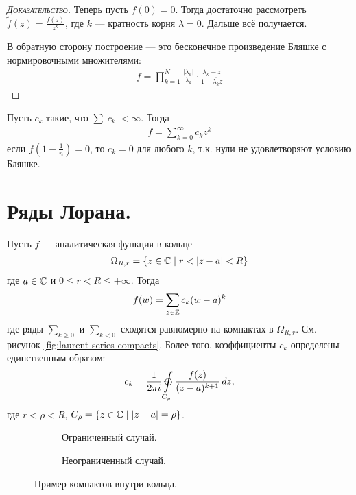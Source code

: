 \documentclass[../complex-analysis.tex]{subfiles}
\begin{document}
\begin{proof}[\normalfont\textsc{Доказательство}]
 Теперь пусть $ f(0) = 0 $. Тогда достаточно рассмотреть  $ \tilde f(z) = \frac{f(z)}{z^{k}} $, где $ k $ --- кратность корня $ \lambda = 0 $. Дальше всё получается.

 В обратную сторону построение --- это бесконечное произведение Бляшке с нормировочными множителями:
  \begin{align*}
   f = \prod_{k=1}^{N} \frac{\left| \lambda_k \right|}{\lambda_k} \cdot \frac{\lambda_k -z}{1 - \overline{\lambda_k} z}
 \end{align*}
\end{proof}

\begin{exmpl*}
 Пусть $ c_k $ такие, что $ \sum \left| c_k \right| < \infty $. Тогда
 \begin{align*}
  f = \sum_{k=0}^{\infty} c_k z^{k}
 \end{align*} если $ f\left(1 - \frac{1}{n}\right) = 0 $, то $ c_k = 0 $ для любого $ k $, т.к. нули не удовлетворяют условию Бляшке.
\end{exmpl*}

\newpage
\section{Ряды Лорана.}

\begin{thm}
 Пусть $ f $ --- аналитическая функция в кольце
 \begin{align*}
  \Omega_{R,r} = \left\{ z \in \mathbb{C} \mid r < \left| z - a \right| < R \right\}
 \end{align*} где $ a \in \mathbb{C} $ и $ 0 \leqslant r < R \leqslant +\infty $. Тогда
 \begin{align}
  \label{equation:loran_series}
  f(w) = \sum_{z \in \mathbb{Z}} c_k(w - a)^{k}
\end{align} где ряды $ \sum_{k \geqslant 0} $ и $ \sum_{k < 0} $ сходятся равномерно на компактах в $ \Omega_{R,r} $. См. рисунок \eqref{fig:laurent-series-compacts}. Более того, коэффициенты $ c_k $ определены единственным образом:
 \begin{align*}
  c_k = \frac{1}{2\pi i} \varointctrclockwise\limits_{C_\rho}   \frac{f(z)}{(z-a)^{k+1}}\,dz,
 \end{align*} где $ r < \rho < R $, $ C_\rho = \left\{ z \in \mathbb{C} \mid \left| z-a \right|=\rho \right\} $.
\end{thm}

\begin{figure}[h]

\begin{subfigure}{0.5\textwidth}
    \caption{Ограниченный случай.}
    \label{fig:laurent-series-compacts-limited}
\end{subfigure}
\begin{subfigure}{0.5\textwidth}
	\caption{Неограниченный случай.}
    \label{fig:laurent-series-compacts-not-limited}
\end{subfigure}

\caption{Пример компактов внутри кольца.}
\label{fig:laurent-series-compacts}
\end{figure}
\end{document}
